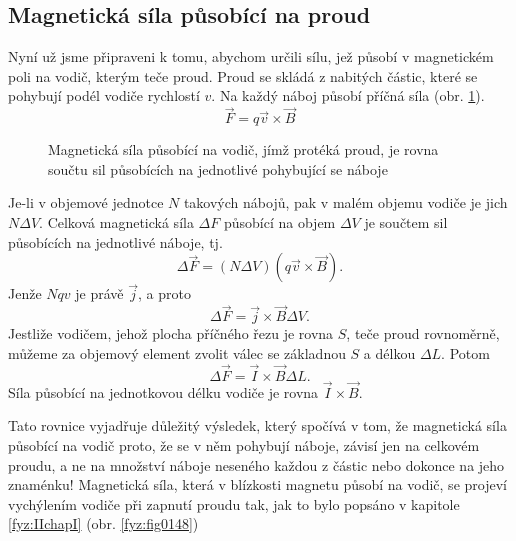     \subsection{Magnetická síla působící na proud}
      \cite[s.~227]{Feynman02} Nyní už jsme připraveni k tomu, abychom určili sílu, jež působí v 
      magnetickém poli na vodič, kterým teče proud. Proud se skládá z nabitých částic, které se 
      pohybují podél vodiče rychlostí \(v\). Na každý náboj působí příčná síla (obr. 
      \ref{fyz:fig0219}).
      \begin{equation}\label{fyz:eq_mag007}
        \vec{F} = q\vec{v}\times\vec{B}
      \end{equation}
      \begin{figure}[ht!]
        \centering
        \caption{Magnetická síla působící na vodič, jímž protéká proud, je rovna součtu sil 
                 působících na jednotlivé pohybující se náboje}
        \label{fyz:fig0219} 
      \end{figure}
      Je-li v objemové jednotce \(N\) takových nábojů, pak v malém objemu vodiče je jich \(N\Delta 
      V\). Celková magnetická síla \(\Delta F\) působící na objem \(\Delta V\) je součtem sil 
      působících na jednotlivé náboje, tj.
      \begin{equation}\label{fyz:eq_mag008}
        \Delta\vec{F} = (N\Delta V)(q\vec{v}\times\vec{B}).
      \end{equation}
      Jenže \(Nqv\) je právě \(\vec{j}\), a proto
      \begin{equation}\label{fyz:eq_mag009}
      \Delta\vec{F} = \vec{j}\times\vec{B}\Delta V.
      \end{equation}
      Jestliže vodičem, jehož plocha příčného řezu je rovna \(S\), teče proud rovnoměrně, můžeme 
      za objemový element zvolit válec se základnou \(S\) a délkou \(\Delta L\). Potom
      \begin{equation}\label{fyz:eq_mag010}
      \Delta\vec{F} = \vec{I}\times\vec{B}\Delta L.
      \end{equation}
      Síla působící na jednotkovou délku vodiče je rovna \(\vec{I}\times\vec{B}\).
      
      Tato rovnice vyjadřuje důležitý výsledek, který spočívá v tom, že magnetická síla působící 
      na vodič proto, že se v něm pohybují náboje, závisí jen na celkovém proudu, a ne na množství 
      náboje neseného každou z částic nebo dokonce na jeho znaménku! Magnetická síla, která v 
      blízkosti magnetu působí na vodič, se projeví vychýlením vodiče při zapnutí proudu tak, jak 
      to bylo popsáno v kapitole \ref{fyz:IIchapI} (obr. \ref{fyz:fig0148})

